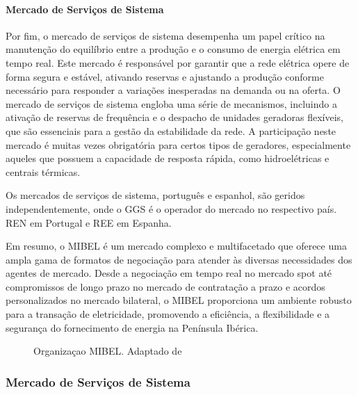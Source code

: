 \paragraph{Mercado de Serviços de Sistema \label{se:servicos_sistema_mibel}}
\text{ }  \par
Por fim, o mercado de serviços de sistema desempenha um papel crítico na manutenção do equilíbrio entre a produção e o consumo de energia elétrica em tempo real. Este mercado é responsável por garantir que a rede elétrica opere de forma segura e estável, ativando reservas e ajustando a produção conforme necessário para responder a variações inesperadas na demanda ou na oferta. O mercado de serviços de sistema engloba uma série de mecanismos, incluindo a ativação de reservas de frequência e o despacho de unidades geradoras flexíveis, que são essenciais para a gestão da estabilidade da rede. A participação neste mercado é muitas vezes obrigatória para certos tipos de geradores, especialmente aqueles que possuem a capacidade de resposta rápida, como hidroelétricas e centrais térmicas.\par
Os mercados de serviços de sistema, português e espanhol, são geridos independentemente, onde o \gls{GGS} é o operador do mercado no respectivo país. \gls{REN} em Portugal e \gls{REE} em Espanha.\par
\bigskip
\bigskip
Em resumo, o \gls{MIBEL} é um mercado complexo e multifacetado que oferece uma ampla gama de formatos de negociação para atender às diversas necessidades dos agentes de mercado. Desde a negociação em tempo real no mercado spot até compromissos de longo prazo no mercado de contratação a prazo e acordos personalizados no mercado bilateral, o \gls{MIBEL} proporciona um ambiente robusto para a transação de eletricidade, promovendo a eficiência, a flexibilidade e a segurança do fornecimento de energia na Península Ibérica.\cite{Rassid2017}\par



\begin{figure}[H]
	\centering
	\resizebox{\linewidth}{!}{}
	\caption{Organizaçao MIBEL. Adaptado de \cite{Rassid2017}}
	\label{fig:mibel_org}
\end{figure}




\subsubsection{Mercado de Serviços de Sistema \label{se:servicos_sistema}}

